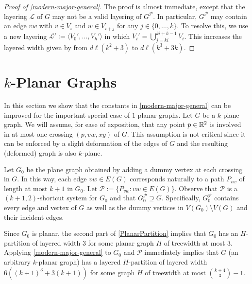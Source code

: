\documentclass{patmorin}
\newcommand{\PP}{\mathcal{P}}
\begin{document}
\begin{proof}[Proof of \cref{modern-major-general}] 
  The proof is almost immediate, except that the layering $\mathcal{L}$ of $G$ may not be a valid layering of $G^{\mathcal{P}}$.  In particular, $G^{\mathcal{P}}$ may contain an edge $vw$ with $v\in V_i$ and $w\in V_{i+j}$ for any $j\in\{0,\ldots,k\}$.  To resolve this, we use a new layering $\mathcal{L}':=\langle V_0',\ldots,V_h'\rangle$ in which $V_i'=\bigcup_{j=ki}^{ki+k-1} V_i$.  This increases the layered width given by  from $d\ell(k^2+3)$ to $d\ell(k^3+3k)$.
\end{proof}

\section{\boldmath $k$-Planar Graphs}
\label{sec-k-planar}

In this section we show that the constants in \cref{modern-major-general} can be improved for the important special case of $1$-planar graphs. Let $G$ be a $k$-plane graph.  We will assume, for ease of exposition, that any point $p\in\mathbb{R}^2$ is involved in at most one crossing $(p,vw,xy)$ of $G$. This assumption is not critical since it can be enforced by a slight deformation of the edges of $G$ and the resulting (deformed) graph is also $k$-plane.  

Let $G_0$ be the plane graph obtained by adding a dummy vertex at each crossing in $G$. In this way, each edge $vw\in E(G)$ corresponds naturally to a path $P_{vw}$ of length at most $k+1$ in $G_0$.  Let $\PP := \{P_{vw}: vw\in E(G)\}$. Observe that $\PP$ is a $(k+1,2)$-shortcut system for $G_0$ and that $G_0^{\mathcal{P}}\supseteq G$.  Specifically, $G_0^{\mathcal{P}}$ contains every edge and vertex of $G$ as well as the dummy vertices in $V(G_0)\setminus V(G)$ and their incident edges.  

Since $G_0$ is planar, the second part of \cref{PlanarPartition} implies that $G_0$ has an $H$-partition of layered width 3 for some planar graph $H$ of treewidth at most 3.  Applying \cref{modern-major-general} to $G_0$ and $\mathcal{P}$ immediately implies that $G$ (an arbitrary $k$-planar graph) has a layered $H$-partition of layered width $6((k+1)^3+3(k+1))$ for some graph $H$ of treewidth at most $\binom{k+4}{3}-1$.
\end{document}
